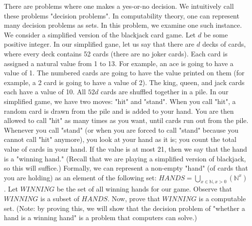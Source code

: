\documentclass[../../../include/open-logic-section]{subfiles}
\begin{document}
\begin{prob}
  There are problems where one makes a yes-or-no decision. We intuitively call these problems "decision problems". In computability theory, one can represent many decision problems as sets. In this problem, we examine one such instance. We consider a simplified version of the blackjack card game. \newline
  Let $d$ be some positive integer. In our simplified gane, let us say that there are $d$ decks of cards, where every deck contains 52 cards (there are no joker cards). Each card is assigned a natural value from 1 to 13. For example, an ace is going to have a value of 1. The numbered cards are going to have the value printed on them (for example, a 2 card is going to have a value of 2). The king, queen, and jack cards each have a value of 10. All $52d$ cards are shuffled together in a pile. \newline
  In our simplified game, we have two moves: "hit" and "stand". When you call "hit", a random card is drawn from the pile and is added to your hand. You are then allowed to call "hit" as many times as you want, until cards run out from the pile. Whenever you call "stand" (or when you are forced to call "stand" because you cannot call "hit" anymore), you look at your hand as it is; you count the total value of cards in your hand. If the value is at most 21, then we say that the hand is a "winning hand." (Recall that we are playing a simplified version of blackjack, so this will suffice.) \newline
  Formally, we can represent a non-empty "hand" (of cards that you are holding) as an element of the following set: $HANDS = \bigcup_{x \in \mathbb{N}, x>0} ( \mathbb{N}^x )$. Let $WINNING$ be the set of all winning hands for our game. Observe that $WINNING$ is a subset of $HANDS$. Now, prove that $WINNING$ is a computable set. (Note: by proving this, we will show that the decision problem of "whether a hand is a winning hand" is a problem that computers can solve.)
\end{prob}
\end{document}

